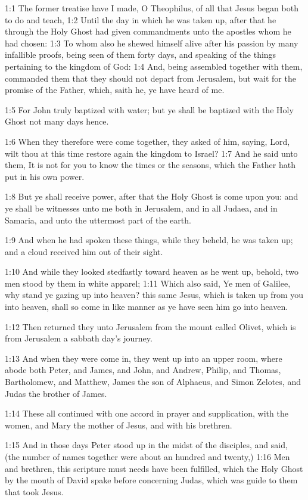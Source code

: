 

1:1 The former treatise have I made, O Theophilus, of all that Jesus
began both to do and teach, 1:2 Until the day in which he was taken
up, after that he through the Holy Ghost had given commandments unto
the apostles whom he had chosen: 1:3 To whom also he shewed himself
alive after his passion by many infallible proofs, being seen of them
forty days, and speaking of the things pertaining to the kingdom of
God: 1:4 And, being assembled together with them, commanded them that
they should not depart from Jerusalem, but wait for the promise of the
Father, which, saith he, ye have heard of me.

1:5 For John truly baptized with water; but ye shall be baptized with
the Holy Ghost not many days hence.

1:6 When they therefore were come together, they asked of him, saying,
Lord, wilt thou at this time restore again the kingdom to Israel?  1:7
And he said unto them, It is not for you to know the times or the
seasons, which the Father hath put in his own power.

1:8 But ye shall receive power, after that the Holy Ghost is come upon
you: and ye shall be witnesses unto me both in Jerusalem, and in all
Judaea, and in Samaria, and unto the uttermost part of the earth.

1:9 And when he had spoken these things, while they beheld, he was
taken up; and a cloud received him out of their sight.

1:10 And while they looked stedfastly toward heaven as he went up,
behold, two men stood by them in white apparel; 1:11 Which also said,
Ye men of Galilee, why stand ye gazing up into heaven? this same
Jesus, which is taken up from you into heaven, shall so come in like
manner as ye have seen him go into heaven.

1:12 Then returned they unto Jerusalem from the mount called Olivet,
which is from Jerusalem a sabbath day's journey.

1:13 And when they were come in, they went up into an upper room,
where abode both Peter, and James, and John, and Andrew, Philip, and
Thomas, Bartholomew, and Matthew, James the son of Alphaeus, and Simon
Zelotes, and Judas the brother of James.

1:14 These all continued with one accord in prayer and supplication,
with the women, and Mary the mother of Jesus, and with his brethren.

1:15 And in those days Peter stood up in the midst of the disciples,
and said, (the number of names together were about an hundred and
twenty,) 1:16 Men and brethren, this scripture must needs have been
fulfilled, which the Holy Ghost by the mouth of David spake before
concerning Judas, which was guide to them that took Jesus.

